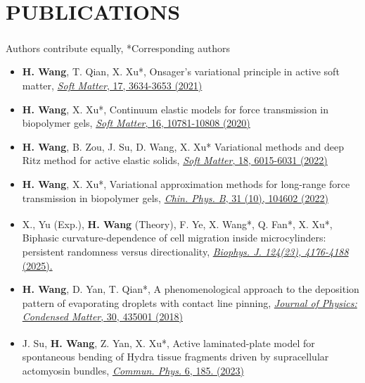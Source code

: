 \documentclass[a4paper,10pt]{extarticle}
\begin{document}
\section*{PUBLICATIONS}
\noindent
\textsuperscript{\textbf{\textdagger}} Authors contribute equally, *Corresponding authors
\noindent
\begin{itemize}[leftmargin=*]
\setlength{\itemsep}{0.2cm}
\item \textbf{H. Wang}, T. Qian, X. Xu*, Onsager’s variational principle in
active soft matter, 
\href{https://doi.org/10.1039/D0SM02076A}{\emph{Soft Matter}, 17, 3634-3653 (2021)}
\item \textbf{H. Wang}, X. Xu*, Continuum elastic models for force transmission in
biopolymer gels,
\href{https://doi.org/10.1039/D0SM01451F}{\textit{Soft Matter}, 16, 10781-10808 (2020)}

\item \textbf{H. Wang}, B. Zou, J. Su, D. Wang, X. Xu* Variational methods and deep Ritz method for active elastic solids,
\href{https://doi.org/10.1039/D2SM00404F}{\textit{Soft Matter}, 18, 6015-6031 (2022)}

\item \textbf{H. Wang}, X. Xu*, Variational approximation methods for long-range force transmission in biopolymer gels,
\href{https://doi.org/10.1088/1674-1056/ac720a}{\textit{Chin. Phys. B}, 31 (10), 104602 (2022)}

\item X., Yu\textsuperscript{\textbf{\textdagger}} (Exp.), \textbf{H. Wang}\textsuperscript{\textbf{\textdagger}} (Theory), F. Ye, X. Wang*, Q. Fan*, X. Xu*, 
Biphasic curvature-dependence of cell migration inside microcylinders: persistent randomness versus directionality, 
\href{https://doi.org/10.1016/j.bpj.2025.10.003}{\emph{Biophys. J. 124(23), 4176-4188} (2025).}

\item \textbf{H. Wang}, D. Yan, T. Qian*, A phenomenological approach to the deposition pattern of evaporating droplets with contact line pinning, 
\href{https://doi.org/10.1088/1361-648X/aae1dc}{\emph{Journal of Physics: Condensed Matter}, 30, 435001 (2018)} 

\item J. Su\textsuperscript{\textbf{\textdagger}}, \textbf{H. Wang}\textsuperscript{\textbf{\textdagger}}, Z. Yan, X. Xu*, Active laminated-plate model for spontaneous bending of Hydra tissue fragments driven by supracellular actomyosin bundles,
\href{https://www.nature.com/articles/s42005-023-01307-9}{\emph{Commun. Phys.} 6, 185. (2023)}


\end{itemize}
\end{document}
